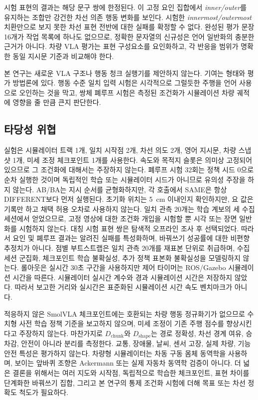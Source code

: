 \documentclass[letterpaper,conference]{IEEEtran}
\newcommand{\dchunk}{D_{\mathrm{chunk}}}
\newcommand{\dshape}{D_{\mathrm{shape}}}
\begin{document}
시험 표현의 결과는 해당 문구 쌍에 한정된다. 이 고정 요인 집합에서
\emph{inner/outer}를 유지하는 조합만 강건한 차선 의존 행동 변화를 보인다. 시험한
\emph{innermost/outermost} 치환만으로 보지 못한 차선 표현 전반에 대한 실패를 확정할
수 없다. 완성된 평가 문장 16개가 작업 목록에 하나도 없으므로, 정확한 문자열의
신규성은 언어 일반화의 충분한 근거가 아니다. 차량 VLA 평가는 표현 구성요소를
요인화하고, 각 반응을 범위가 명확한 동일 지시문 기준과 비교해야 한다.

본 연구는 새로운 VLA 구조나 행동 청크 실행기를 제안하지 않는다. 기여는 형태와 평가
방법론에 있다. 행동 수준 일치 입력 시험은 시각적으로 그럴듯한 주행을 언어 사용으로
오인하는 것을 막고, 쌍체 폐루프 시험은 측정된 조건화가 시뮬레이션 차량 궤적에 영향을
줄 만큼 큰지 판단한다.

\subsection{타당성 위협}
실험은 시뮬레이터 트랙 1개, 일치 시작점 2개, 차선 의도 2개, 영어 지시문, 차량
스냅샷 1개, 미세 조정 체크포인트 1개를 사용한다. 속도와 목적지 슬롯은 의미상 고정되어
있으므로 그 조건화에 대해서는 주장하지 않는다. 폐루프 시험 32회는 정책 시드 0으로
순차 실행한 것이며 독립적인 학습 또는 시뮬레이터 시드가 아니므로 유의성 주장을 하지
않는다. AB/BA는 지시 순서를 균형화하지만, 각 호출에서 SAME은 항상 DIFFERENT보다
먼저 실행된다. 초기화 위치는 5~cm 이내인지 확인하지만, 요 값은 기록만 하고 채택 허용
오차로 사용하지 않는다. 일치 관측 20개는 학습 계보의 세 수집 세션에서 얻었으므로,
고정 영상에 대한 조건화 개입을 시험할 뿐 시각 또는 장면 일반화를 시험하지 않는다.
대칭 시험 표현 쌍은 탐색적 오프라인 조사 후 선택되었다. 따라서 요인 및 폐루프 결과는
알려진 실패를 특성화하며, 바꿔쓰기 성공률에 대한 비편향 추정치가 아니다. 점별
부트스트랩은 일치 관측 20개를 재표본 단위로 취급하며, 수집 세션 군집화, 체크포인트
학습 불확실성, 추가 정책 표본화 불확실성을 모델링하지 않는다. 롤아웃은 실시간 30초
구간을 사용하지만 제어 타이머는 ROS/Gazebo 시뮬레이션 시간을 따른다. 시뮬레이터
실시간 계수와 경과 시뮬레이션 시간은 저장하지 않았다. 따라서 보고한 거리와 실시간은
표준화된 시뮬레이션 시간 속도 벤치마크가 아니다.

적응하지 않은 SmolVLA 체크포인트에는 호환되는 차량 행동 정규화기가 없으므로 수치형
사전 학습 정책 기준을 보고하지 않으며, 미세 조정이 기존 주행 점수를 향상시킨다고
주장하지 않는다. 마찬가지로 $\dchunk$와 $\dshape$는 경로 정확성, 차선 경계 여유,
승차감, 안전이 아니라 분리를 측정한다. 교통, 장애물, 날씨, 센서 고장, 실제 차량,
기능 안전 특성은 평가하지 않는다. 차량형 시뮬레이터는 차동 구동 몸체 동역학을
사용하며, 보이는 앞바퀴 조향은 Ackermann 또는 실제 자동차 동역학 검증이 아니다.
더 넓은 결론을 위해서는 여러 지도와 시작점, 독립적으로 학습한 체크포인트, 표현 차이를
단계화한 바꿔쓰기 집합, 그리고 본 연구의 통제 조건화 시험에 더해 목표 또는 차선 정확도
척도가 필요하다.
\end{document}
